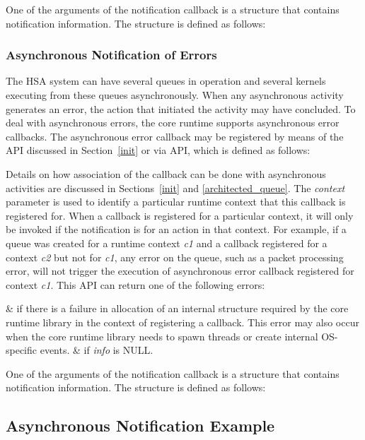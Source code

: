 One of the arguments of the notification callback is a structure
that contains notification information. The structure is defined as
follows:



\subsubsection{Asynchronous Notification of Errors}\label{asynnotif}

The HSA system can have several queues in operation and
several kernels executing from these queues asynchronously.
When any asynchronous activity generates an error, the action that
initiated the activity may have concluded. To deal with
asynchronous errors, the core runtime supports asynchronous error
callbacks. The asynchronous error callback may be registered by means of the
 API discussed in Section~\ref{init} or via
 API, which is defined as
follows:



Details on how association of the callback can be done with
asynchronous activities are discussed in Sections~\ref{init} and
\ref{architected_queue}. The {\itshape context} parameter is used
to identify a particular runtime context that this callback is
registered for. When a callback is registered for a particular
context, it will only be invoked if the notification is for an
action in that context. For example, if a queue was created for a
runtime context {\itshape c1} and a callback registered for a
context {\itshape c2} but not for {\itshape c1}, any error on the
queue, such as a packet processing error, will not trigger the
execution of asynchronous error callback registered for context
{\itshape c1}. This API can return one of the following errors:

\begin{easylist}
&  if there is a failure
in allocation of an internal structure required by the core runtime
library in the context of registering a callback. This error may
also occur when the core runtime library needs to spawn threads or
create internal OS-specific events.
& 
if {\itshape info} is NULL.
\end{easylist}

One of the arguments of the notification callback is a structure
that contains notification information. The structure is defined as
follows:



\subsection{Asynchronous Notification Example}


